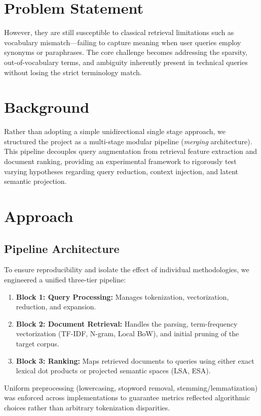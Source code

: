 \documentclass[runningheads]{llncs}
\begin{document}
\section{Problem Statement}
However, they are still susceptible to classical retrieval limitations such as vocabulary mismatch---failing to capture meaning when user queries employ synonyms or paraphrases. The core challenge becomes addressing the sparsity, out-of-vocabulary terms, and ambiguity inherently present in technical queries without losing the strict terminology match.

\section{Background}
Rather than adopting a simple unidirectional single stage approach, we structured the project as a multi-stage modular pipeline (\textit{merging} architecture). This pipeline decouples query augmentation from retrieval feature extraction and document ranking, providing an experimental framework to rigorously test varying hypotheses regarding query reduction, context injection, and latent semantic projection.

\section{Approach}
\subsection{Pipeline Architecture}
To ensure reproducibility and isolate the effect of individual methodologies, we engineered a unified three-tier pipeline:
\begin{enumerate}
    \item \textbf{Block 1: Query Processing:} Manages tokenization, vectorization, reduction, and expansion.
    \item \textbf{Block 2: Document Retrieval:} Handles the parsing, term-frequency vectorization (TF-IDF, N-gram, Local BoW), and initial pruning of the target corpus.
    \item \textbf{Block 3: Ranking:} Maps retrieved documents to queries using either exact lexical dot products or projected semantic spaces (LSA, ESA).
\end{enumerate}
Uniform preprocessing (lowercasing, stopword removal, stemming/lemmatization) was enforced across implementations to guarantee metrics reflected algorithmic choices rather than arbitrary tokenization disparities.
\end{document}

